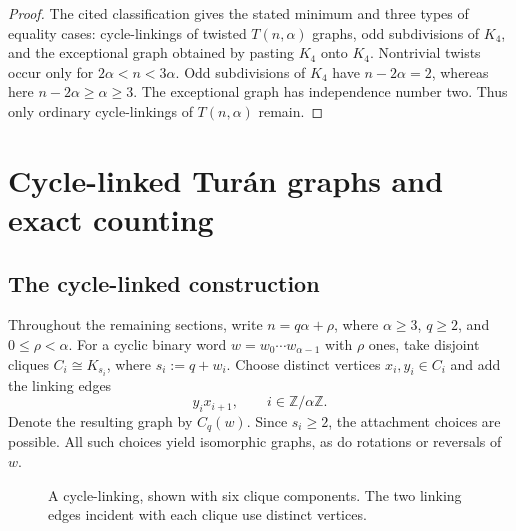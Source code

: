 \documentclass[11pt]{article}
\theoremstyle{definition}
\begin{document}
\begin{proof}
The cited classification gives the stated minimum and three types of
equality cases: cycle-linkings of twisted $T(n,\alpha)$ graphs, odd
subdivisions of $K_4$, and the exceptional graph obtained by pasting
$K_4$ onto $K_4$. Nontrivial twists occur only for
$2\alpha<n<3\alpha$. Odd subdivisions of $K_4$ have
$n-2\alpha=2$, whereas here $n-2\alpha\ge\alpha\ge3$.
The exceptional graph has independence number two. Thus only ordinary
cycle-linkings of $T(n,\alpha)$ remain.
\end{proof}


\section{Cycle-linked Tur\'an graphs and exact counting}
\label{sec:cycle-linkings}

\subsection{The cycle-linked construction}

Throughout the remaining sections, write $n=q\alpha+\rho$, where
$\alpha\ge3$, $q\ge2$, and $0\le\rho<\alpha$. For a cyclic binary
word $w=w_0\cdots w_{\alpha-1}$ with $\rho$ ones, take disjoint
cliques $C_i\cong K_{s_i}$, where $s_i:=q+w_i$. Choose distinct
vertices $x_i,y_i\in C_i$ and add the linking edges
\[
 y_ix_{i+1},\qquad i\in\mathbb Z/\alpha\mathbb Z.
\]
Denote the resulting graph by $C_q(w)$. Since $s_i\ge2$, the
attachment choices are possible. All such choices yield isomorphic
graphs, as do rotations or reversals of $w$.

\begin{figure}[ht]
\centering
{}
\caption{A cycle-linking, shown with six clique components. The two
linking edges incident with each clique use distinct vertices.}
\label{fig:cycle-linking}
\end{figure}
\end{document}
